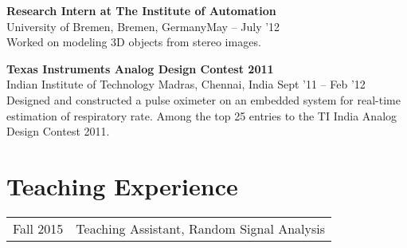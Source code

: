 \documentclass[margin,line,pifont,palatino,courier]{res}
\newenvironment{list1}{
  \begin{list}{\ding{113}}{%
      \setlength{\itemsep}{0in}
      \setlength{\parsep}{0in} \setlength{\parskip}{0in}
      \setlength{\topsep}{0in} \setlength{\partopsep}{0in}
      \setlength{\leftmargin}{0.17in}}}{\end{list}}
\begin{document}
\begin{resume}
\textbf{Research Intern at The Institute of Automation}  \\
University of Bremen, Bremen, Germany\hfill May -- July '12 \vspace{2pt}\\
Worked on modeling 3D objects from stereo images. %

\textbf{Texas Instruments Analog Design Contest 2011} \\
Indian Institute of Technology Madras, Chennai, India \hfill Sept '11 -- Feb '12 \vspace{2pt} \\
Designed and constructed a pulse oximeter on an embedded system for real-time estimation of respiratory rate. Among the top 25 entries to the TI India Analog Design Contest 2011.\\
\vspace{-5pt}

\section{\sc Teaching Experience}
\begin{tabular}{@{}p{0.9in} p{4in}}
Fall 2015 & Teaching Assistant, Random Signal Analysis \\
\end{tabular}

%
%
%


\end{resume}
\end{document}

